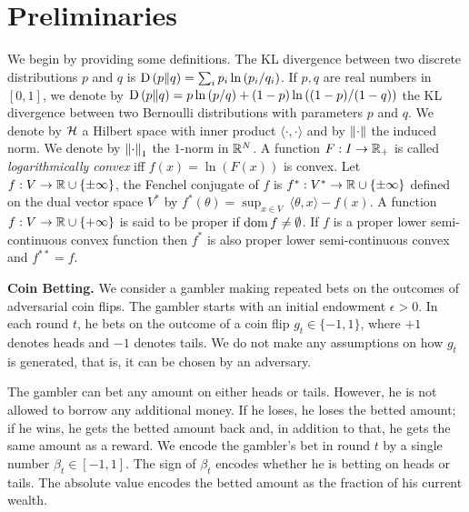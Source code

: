 
\section{Preliminaries}
\label{section:preliminaries}

We begin by providing some definitions.
The \ac{KL} divergence between two discrete distributions $p$ and $q$ is
$\operatorname{D}\left({p}\middle\|{q}\right) = \sum_{i} p_i \ln\left( p_i/q_i \right)$. If $p,q$ are real numbers
in $[0,1]$, we denote by $\operatorname{D}\left({p}\middle\|{q}\right) = p \ln \left(p/q \right) + (1-p) \ln
\left((1-p)/(1-q) \right)$ the \ac{KL} divergence between two Bernoulli
distributions with parameters $p$ and $q$.  We denote by $\mathcal{H}$ a Hilbert space
with inner product $\langle \cdot, \cdot\rangle$ and by $\left\|{\cdot}\right\|$ the
induced norm.  We denote by $\left\|{\cdot}\right\|_1$ the $1$-norm in $\mathbb{R}^N$.  A
function $F:I \to \mathbb{R}_+$ is called \emph{logarithmically convex} iff $f(x) =
\ln(F(x))$ is convex.  Let $f:V \to \mathbb{R} \cup \{\pm\infty\}$, the Fenchel
conjugate of $f$ is $f^*:V^* \to \mathbb{R} \cup \{\pm \infty\}$ defined on the dual
vector space $V^*$ by $f^*(\theta) = \sup_{x \in V} \ \langle \theta, x \rangle
- f(x)$.  A function $f:V \to \mathbb{R} \cup \{+ \infty\}$ is said to be proper if
$\operatorname*{dom} f \neq \emptyset$.  If $f$ is a proper lower semi-continuous convex
function then $f^*$ is also proper lower semi-continuous convex and
$f^{**}=f$.

\textbf{Coin Betting.} We consider a gambler making
repeated bets on the outcomes of adversarial coin flips. The gambler starts with an
initial endowment $\epsilon > 0$. In each round $t$, he bets on the outcome of a
coin flip $g_t \in \{-1,1\}$, where $+1$ denotes heads and $-1$ denotes tails.
We do not make any assumptions on how $g_t$ is generated, that is, it can be
chosen by an adversary.

The gambler can bet any amount on either heads or tails. However, he is not
allowed to borrow any additional money. If he loses, he loses the betted
amount; if he wins, he gets the betted amount back and, in addition to that, he
gets the same amount as a reward.  We encode the gambler's bet in round $t$ by a
single number $\beta_t \in [-1,1]$. The sign of $\beta_t$ encodes whether he is
betting on heads or tails. The absolute value encodes the betted amount as the
fraction of his current wealth.

